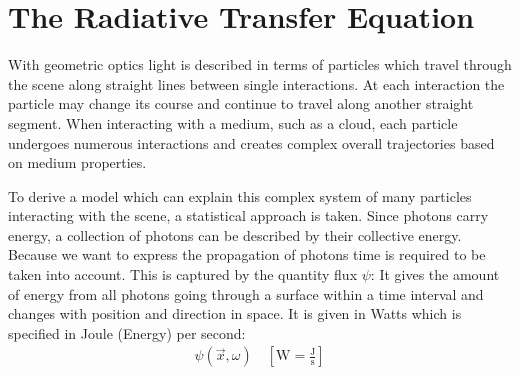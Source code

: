 \section{The Radiative Transfer Equation}

With geometric optics light is described in terms of particles which travel through the scene along straight lines between single interactions. At each interaction the particle may change its course and continue to travel along another straight segment. When interacting with a medium, such as a cloud, each particle undergoes numerous interactions and creates complex overall trajectories based on medium properties.

To derive a model which can explain this complex system of many particles interacting with the scene, a statistical approach is taken. Since photons carry energy, a collection of photons can be described by their collective energy. Because we want to express the propagation of photons time is required to be taken into account. This is captured by the quantity flux $\psi$: It gives the amount of energy from all photons going through a surface within a time interval and changes with position and direction in space. It is given in Watts which is specified in Joule (Energy) per second:
\begin{align*}
\psi\left(\vec{x}, \omega\right)
\quad
\left[\si{\watt} = \frac{\si{\joule}}{\si{\second}}\right]
\end{align*}

